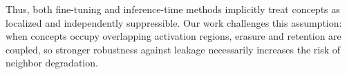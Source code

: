 Thus, both fine-tuning and inference-time methods implicitly treat concepts as localized and independently suppressible. Our work challenges this assumption: when concepts occupy overlapping activation regions, erasure and retention are coupled, so stronger robustness against leakage necessarily increases the risk of neighbor degradation.


